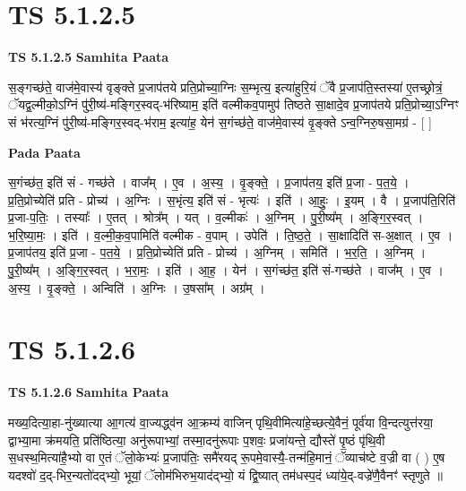 \documentclass[17pt]{extarticle}
\begin{document}

\section{ TS 5.1.2.5 }

\textbf{TS 5.1.2.5 } \newline
\textbf{Samhita Paata} \newline

स॒ङ्गच्छ॑ते॒ वाज॑मे॒वास्य॑ वृङ्क्ते प्र॒जाप॑तये प्रति॒प्रोच्या॒ग्निः स॒म्भृत्य॒ इत्या॑हुरि॒यं ॅवै प्र॒जाप॑ति॒स्तस्या॑ ए॒तच्छ्रोत्रं॒ ॅयद्व॒ल्मीको॒ऽग्निं पु॑री॒ष्य॑-मङ्गिर॒स्वद्-भ॑रिष्याम॒ इति॑ वल्मीकव॒पामुप॑ तिष्ठते सा॒क्षादे॒व प्र॒जाप॑तये प्रति॒प्रोच्या॒ऽग्निꣳ सं भ॑रत्य॒ग्निं पु॑री॒ष्य॑-मङ्गिर॒स्वद्-भ॑राम॒ इत्या॑ह॒ येन॑ स॒गंच्छ॑ते॒ वाज॑मे॒वास्य॑ वृ॒ङ्क्ते ऽन्व॒ग्निरु॒षसा॒मग्र॑ - [  ] \newline

\textbf{Pada Paata} \newline

स॒गंच्छ॑त॒ इति॑ सं - गच्छ॑ते । वाज᳚म् । ए॒व । अ॒स्य॒ । वृ॒ङ्क्ते॒ । प्र॒जाप॑तय॒ इति॑ प्र॒जा - प॒त॒ये॒ । प्र॒ति॒प्रोच्येति॑ प्रति - प्रोच्य॑ । अ॒ग्निः । स॒भृंत्य॒ इति॑ सं - भृत्यः॑ । इति॑ । आ॒हुः॒ । इ॒यम् । वै । प्र॒जाप॑ति॒रिति॑ प्र॒जा-प॒तिः॒ । तस्याः᳚ । ए॒तत् । श्रोत्र᳚म् । यत् । व॒ल्मीकः॑ । अ॒ग्निम् । पु॒री॒ष्य᳚म् । अ॒ङ्गि॒र॒स्वत् । भ॒रि॒ष्या॒मः॒ । इति॑ । व॒ल्मी॒क॒व॒पामिति॑ वल्मीक - व॒पाम् । उपेति॑ । ति॒ष्ठ॒ते॒ । सा॒क्षादिति॑ स-अ॒क्षात् । ए॒व । प्र॒जाप॑तय॒ इति॑ प्र॒जा - प॒त॒ये॒ । प्र॒ति॒प्रोच्येति॑ प्रति - प्रोच्य॑ । अ॒ग्निम् । समिति॑ । भ॒र॒ति॒ । अ॒ग्निम् । पु॒री॒ष्य᳚म् । अ॒ङ्गि॒र॒स्वत् । भ॒रा॒मः॒ । इति॑ । आ॒ह॒ । येन॑ । स॒गंच्छ॑त॒ इति॑ सं-गच्छ॑ते । वाज᳚म् । ए॒व । अ॒स्य॒ । वृ॒ङ्क्ते॒ । अन्विति॑ । अ॒ग्निः । उ॒षसा᳚म् । अग्र᳚म् ।  \newline





\section{ TS 5.1.2.6 }

\textbf{TS 5.1.2.6 } \newline
\textbf{Samhita Paata} \newline

मख्य॒दित्या॒हा-नु॑ख्यात्या आ॒गत्य॑ वा॒ज्यद्ध्व॑न आ॒क्रम्य॑ वाजिन् पृथि॒वीमित्या॑हे॒च्छत्ये॒वैनं॒ पूर्व॑या वि॒न्दत्युत्त॑रया॒ द्वाभ्या॒मा क्र॑मयति॒ प्रति॑ष्ठित्या॒ अनु॑रूपाभ्यां॒ तस्मा॒दनु॑रूपाः प॒शवः॒ प्रजा॑यन्ते॒ द्यौस्ते॑ पृ॒ष्ठं पृ॑थि॒वी स॒धस्थ॒मित्या॑है॒भ्यो वा ए॒तं ॅलो॒केभ्यः॑ प्र॒जाप॑तिः॒ समै॑रयद् रू॒पमे॒वास्यै॒-तन्म॑हि॒मानं॒ ॅव्याच॑ष्टे व॒ज्री वा ( ) ए॒ष यदश्वो॑ द॒द्-भिर॒न्यतो॑दद्भ्यो॒ भूयां॒ ॅलोम॑भिरुभ॒याद॑द्भ्यो॒ यं द्वि॒ष्यात् तम॑धस्प॒दं ध्या॑ये॒द्-वज्रे॑णै॒वैनꣳ॑ स्तृणुते ॥ \newline
\end{document}
